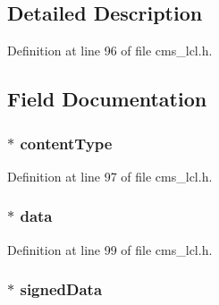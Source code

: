 \subsection{Detailed Description}


Definition at line 96 of file cms\+\_\+lcl.\+h.



\subsection{Field Documentation}
\subsubsection[{\texorpdfstring{content\+Type}{contentType}}]{$\ast$ content\+Type}\hypertarget{struct_c_m_s___content_info__st_af82a0c3993f8e0dc4a321794538ce00d}{}\label{struct_c_m_s___content_info__st_af82a0c3993f8e0dc4a321794538ce00d}


Definition at line 97 of file cms\+\_\+lcl.\+h.

\subsubsection[{\texorpdfstring{data}{data}}]{$\ast$ data}\hypertarget{struct_c_m_s___content_info__st_ad912ad9a7275eda123accbf6fbdc5daa}{}\label{struct_c_m_s___content_info__st_ad912ad9a7275eda123accbf6fbdc5daa}


Definition at line 99 of file cms\+\_\+lcl.\+h.

\subsubsection[{\texorpdfstring{signed\+Data}{signedData}}]{$\ast$ signed\+Data}\hypertarget{struct_c_m_s___content_info__st_adde505155e1826baaf9a5954d31a533b}{}\label{struct_c_m_s___content_info__st_adde505155e1826baaf9a5954d31a533b}


